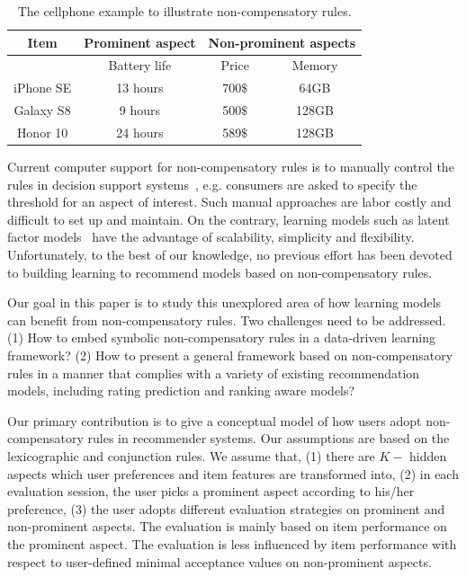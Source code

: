 \documentclass[letterpaper]{article} %
\begin{document}
\begin{table}[htp]\label{tab:rules}
\caption{The cellphone example to illustrate non-compensatory rules.}
\begin{center}
\begin{tabular}{|c|c|c|c|}
\hline
Item & Prominent aspect & \multicolumn{2}{|c|}{Non-prominent aspects}\\\hline
& Battery life &  Price & Memory \\\hline
iPhone SE &  13 hours & 700$\$$ & 64GB  \\\hline
Galaxy S8 & 9 hours& 500$\$$  & 128GB \\\hline
Honor 10 & 24 hours& 589$\$$ & 128GB \\\hline
\end{tabular}
\end{center}
\label{tab:example}
\end{table}%

Current computer support for non-compensatory rules is to manually control the rules in decision support systems~\cite{Lee2009Transforming}, e.g. consumers are asked to specify the threshold for an aspect of interest. Such manual approaches are labor costly and difficult to set up and maintain. On the contrary, learning models such as latent factor models~\cite{Koren2009Matrix} have the advantage of scalability, simplicity and flexibility. Unfortunately, to the best of our knowledge, no previous effort has been devoted to building learning to recommend models based on non-compensatory rules. 

Our goal in this paper is to study this unexplored area of how learning models can benefit from non-compensatory rules. Two challenges need to be addressed. (1) How to embed symbolic non-compensatory rules in a data-driven learning framework? (2) How to present a general framework based on non-compensatory rules in a manner that complies with a variety of existing recommendation models, including rating prediction and ranking aware models?  

Our primary contribution is to give a conceptual model of how users adopt non-compensatory rules in recommender systems. Our assumptions are based on the lexicographic and conjunction rules. We assume that, (1) there are $K-$ hidden aspects which  user preferences and item features are transformed into, (2) in each evaluation session, the user picks a prominent aspect according to his/her preference, (3) the user adopts different evaluation strategies on prominent and non-prominent aspects. The evaluation is mainly based on item performance on the prominent aspect. The evaluation is less influenced by item performance with respect to user-defined minimal acceptance values on non-prominent aspects.
\end{document}
